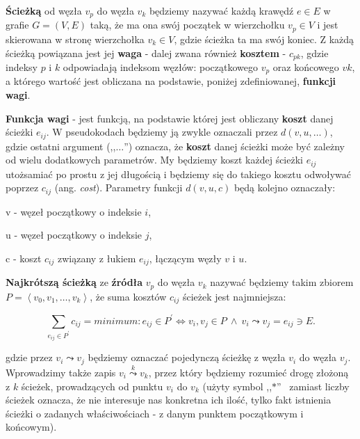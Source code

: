 \begin{myitemize}

\item \textbf{Ścieżką} od węzła $v_{p}$ do węzła $v_{k}$ będziemy nazywać każdą krawędź $e \in E$ w grafie $G = \left( V, E \right)$ taką, że ma ona swój początek w wierzchołku $v_{p} \in V$ i jest skierowana w stronę wierzchołka $v_{k} \in V$, gdzie ścieżka ta ma swój koniec. Z każdą ścieżką powiązana jest jej \textbf{waga} - dalej zwana również \textbf{kosztem} - $c_{pk}$, gdzie indeksy $p$ i $k$ odpowiadają indeksom węzłów: początkowego $v_{p}$ oraz końcowego $v{k}$, a którego wartość jest obliczana na podstawie, poniżej zdefiniowanej, \textbf{funkcji wagi}.

\item \textbf{Funkcja wagi} - jest funkcją, na podstawie której jest obliczany \textbf{koszt} danej ścieżki $e_{ij}$. W pseudokodach będziemy ją zwykle oznaczali przez $ d \left( v, u, \ldots \right) $, gdzie ostatni argument (,,$\ldots$'') oznacza, że \textbf{koszt} danej ścieżki może być zależny od wielu dodatkowych parametrów. My będziemy koszt każdej ścieżki $e_{ij}$ utożsamiać po prostu z jej długością i będziemy się do takiego kosztu odwoływać poprzez $c_{ij}$ (ang. \textit{cost}). Parametry funkcji $ d \left( v, u, c \right) $ będą kolejno oznaczały:

\begin{myitemize}

\item[v] - węzeł początkowy o indeksie $i$,
\item[u] - węzeł początkowy o indeksie $j$,
\item[c] - koszt $c_{ij}$ związany z łukiem $e_{ij}$, łączącym węzły $v$ i $u$.

\end{myitemize}


\item \textbf{Najkrótszą ścieżką} ze \textbf{źródła} $v_{p}$ do węzła $v_{k}$ nazywać będziemy takim zbiorem $P = \left \langle v_{0}, v_{1}, \ldots, v_{k} \right \rangle $, że suma kosztów $c_{ij}$ ścieżek jest najmniejsza:

\begin{equation}
\sum_{e_{ij} \in P^{'}} c_{ij} = minimum : e_{ij} \in P^{'} \Leftrightarrow v_{i},v_{j} \in P \: \wedge \: v_{i} \leadsto v_{j} = e_{ij} \ni E.
\end{equation}

gdzie przez $v_{i} \leadsto v_{j}$ będziemy oznaczać pojedynczą ścieżkę z węzła $v_{i}$ do węzła $v_{j}$. Wprowadzimy także zapis $v_{i} \overset{k}\leadsto v_{k}$, przez który będziemy rozumieć drogę złożoną z $k$ ścieżek, prowadzących od punktu $v_{i}$ do $v_{k}$ (użyty symbol ,,$*$''~ zamiast liczby ścieżek oznacza, że nie interesuje nas konkretna ich ilość, tylko fakt istnienia ścieżki o zadanych właściwościach - z danym punktem początkowym i końcowym). 


\end{myitemize}
